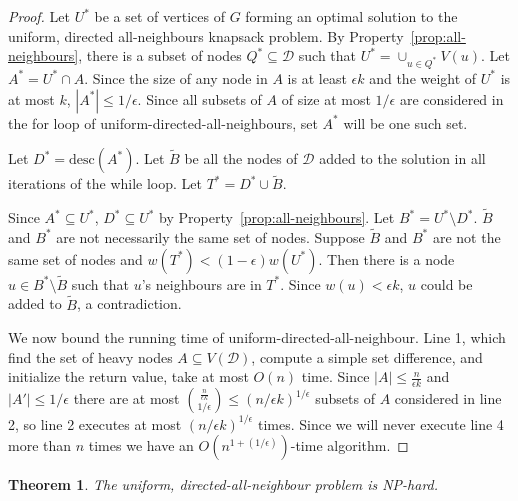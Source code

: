 \documentclass[12pt]{article}
\newtheorem{theorem}{Theorem}
\newcommand{\desc}{\ensuremath{\mathrm{desc}}}
\begin{document}
\begin{proof}
Let $U^*$ be a set of vertices of $G$ forming an optimal solution to
the uniform, directed all-neighbours knapsack problem.  By Property~\ref{prop:all-neighbours},
there is a subset of nodes $Q^{*} \subseteq \mathcal{D}$ such that $U^* =
\cup_{u\in Q^*} V(u)$. Let $A^* = U^* \cap A$.  Since the size of
any node in $A$ is at least $\epsilon k$ and the weight of $U^*$ is
at most $k$, $|A^*| \leq 1/\epsilon$.  Since all subsets of $A$ of
size at most $1/\epsilon$ are considered in the for loop of {\sc
uniform-directed-all-neighbours}, set $A^*$ will be one such set.

Let $D^* = \desc(A^*)$.  Let $\tilde{B}$ be all the nodes of $\mathcal{D}$ added to
the solution in all iterations of the while loop.  Let $T^*=D^* \cup \tilde{B}$.

Since $A^* \subseteq U^*$, $D^* \subseteq U^*$ by
Property~\ref{prop:all-neighbours}.  Let $B^* = U^* \setminus D^*$.  $\tilde B$ and $B^*$ are not necessarily the same
set of nodes.  Suppose $\tilde B$ and $B^*$ are not the same set of
nodes and $w(T^*) < (1-\epsilon)w(U^*)$.  Then there is a node $u
\in B^* \setminus \tilde B$ such that $u$'s neighbours are in
$T^*$.  Since $w(u) < \epsilon k$, $u$ could be added to $\tilde B$,
a contradiction.


We now bound the running time of {\sc uniform-directed-all-neighbour}.
Line 1, which find the set of heavy nodes $A\subseteq V(\mathcal{D})$,
compute a simple set difference, and initialize the return value, take
at most $O(n)$ time.  Since $|A| \leq \frac{n}{\epsilon k}$ and $|A'|
\leq 1/ \epsilon$ there are at most ${\frac{n}{ \epsilon k} \choose 1/
\epsilon} \leq (n / \epsilon k)^{1/\epsilon}$ subsets of $A$
considered in line 2, so line 2 executes at most $(n / \epsilon
k)^{1/\epsilon}$ times.  Since we will never execute line 4 more than
$n$ times we have an $O(n^{1+(1/\epsilon)})$-time algorithm.
\end{proof}

\begin{theorem} \label{thm:uniform-directed-all-hard}
The uniform, directed-all-neighbour problem is NP-hard.
\end{theorem}
\end{document}
